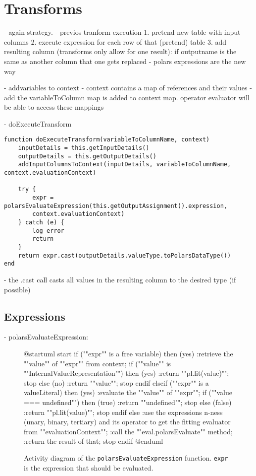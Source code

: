 \section{Transforms}
- again strategy.
- previos tranform execution
1. pretend new table with input columns
2. execute expression for each row of that (pretend) table
3. add resulting column (transforms only allow for one result): if outputname is the same as another column that one gets replaced
- polars expressions are the new way

- addvariables to context
- context contains a map of references and their values
- add the variableToColumn map is added to context map. operator evaluator will be able to access these mappings

- doExecuteTransform
\begin{listing}
	\begin{verbatim}
function doExecuteTransform(variableToColumnName, context)
	inputDetails = this.getInputDetails()
	outputDetails = this.getOutputDetails()
	addInputColumnsToContext(inputDetails, variableToColumnName, context.evaluationContext)

	try {
		expr = polarsEvaluateExpression(this.getOutputAssignment().expression,
		context.evaluationContext)
	} catch (e) {
		log error
		return
	}
	return expr.cast(outputDetails.valueType.toPolarsDataType())
end
	\end{verbatim}
\end{listing}
- the .cast call casts all values in the resulting column to the desired type (if possible)

\subsection{Expressions}
- polarsEvaluateExpression:
\begin{figure}
	\begin{plantuml}
		@startuml
		start
		if (""expr"" is a free variable) then (yes)
		:retrieve the ""value"" of ""expr"" from context;
		if (""value"" is ""InternalValueRepresentation"") then (yes)
		:return ""pl.lit(value)"";
		stop
		else (no)
		:return ""value"";
		stop
		endif
		elseif (""expr"" is a valueLiteral) then (yes)
		:evaluate the ""value"" of ""expr"";
		if (""value === undefined"") then (true)
		:return ""undefined"";
		stop
		else (false)
		:return ""pl.lit(value)"";
		stop
		endif
		else
		:use the expressions n-ness (unary, binary, tertiary) and its
		operator to get the fitting evaluator from ""evaluationContext"";
		:call the ""eval.polarsEvaluate"" method;
		:return the result of that;
		stop
		endif
		@enduml
	\end{plantuml}
	\caption{
		Activity diagram of the \Verb|polarsEvaluateExpression| function.
		\Verb|expr| is the expression that should be evaluated. %
	}
	\label{fig:uml:polars_evaluate_expression}
\end{figure}



